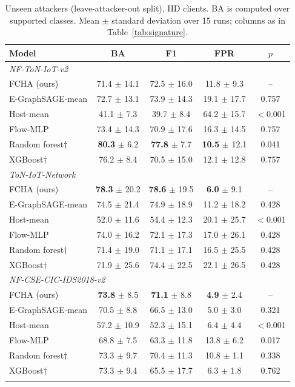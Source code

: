 \documentclass[pdflatex,sn-mathphys-num]{sn-jnl}
\newcommand{\best}[1]{\textbf{#1}}
\begin{document}
\begin{table}[t]
\caption{Unseen attackers (leave-attacker-out split), IID clients. BA is computed over supported classes. Mean $\pm$ standard deviation over 15 runs; columns as in Table~\ref{tab:signature}.}\label{tab:attacker}
\begin{tabular*}{\textwidth}{@{\extracolsep\fill}lcccc}
\toprule
Model & BA & F1 & FPR & $p$ \\
\midrule
\multicolumn{5}{l}{\emph{NF-ToN-IoT-v2}}\\
FCHA (ours) & 71.4 $\pm$ 14.1 & 72.5 $\pm$ 16.0 & 11.8 $\pm$ 9.3 & -- \\
E-GraphSAGE-mean & 72.7 $\pm$ 13.1 & 73.9 $\pm$ 14.3 & 19.1 $\pm$ 17.7 & 0.757 \\
Host-mean & 41.1 $\pm$ 7.3 & 39.7 $\pm$ 8.4 & 64.2 $\pm$ 15.7 & $<$0.001 \\
Flow-MLP & 73.4 $\pm$ 14.3 & 70.9 $\pm$ 17.6 & 16.3 $\pm$ 14.5 & 0.757 \\
Random forest$\dagger$ & \best{80.3} $\pm$ 6.2 & \best{77.8} $\pm$ 7.7 & \best{10.5} $\pm$ 12.1 & 0.041 \\
XGBoost$\dagger$ & 76.2 $\pm$ 8.4 & 70.5 $\pm$ 15.0 & 12.1 $\pm$ 12.8 & 0.757 \\
\midrule
\multicolumn{5}{l}{\emph{ToN-IoT-Network}}\\
FCHA (ours) & \best{78.3} $\pm$ 20.2 & \best{78.6} $\pm$ 19.5 & \best{6.0} $\pm$ 9.1 & -- \\
E-GraphSAGE-mean & 74.5 $\pm$ 21.4 & 74.9 $\pm$ 18.9 & 11.2 $\pm$ 18.2 & 0.428 \\
Host-mean & 52.0 $\pm$ 11.6 & 54.4 $\pm$ 12.3 & 20.1 $\pm$ 25.7 & $<$0.001 \\
Flow-MLP & 74.0 $\pm$ 16.2 & 72.1 $\pm$ 17.3 & 17.0 $\pm$ 26.1 & 0.428 \\
Random forest$\dagger$ & 71.4 $\pm$ 19.0 & 71.1 $\pm$ 17.1 & 16.5 $\pm$ 25.5 & 0.428 \\
XGBoost$\dagger$ & 71.9 $\pm$ 25.6 & 74.4 $\pm$ 22.5 & 22.1 $\pm$ 26.5 & 0.428 \\
\midrule
\multicolumn{5}{l}{\emph{NF-CSE-CIC-IDS2018-v2}}\\
FCHA (ours) & \best{73.8} $\pm$ 8.5 & \best{71.1} $\pm$ 8.8 & \best{4.9} $\pm$ 2.4 & -- \\
E-GraphSAGE-mean & 70.5 $\pm$ 8.8 & 66.5 $\pm$ 13.0 & 5.0 $\pm$ 3.0 & 0.321 \\
Host-mean & 57.2 $\pm$ 10.9 & 52.3 $\pm$ 15.1 & 6.4 $\pm$ 4.4 & $<$0.001 \\
Flow-MLP & 68.8 $\pm$ 7.5 & 63.3 $\pm$ 11.8 & 13.8 $\pm$ 6.2 & 0.017 \\
Random forest$\dagger$ & 73.3 $\pm$ 9.7 & 70.4 $\pm$ 11.3 & 10.8 $\pm$ 1.1 & 0.338 \\
XGBoost$\dagger$ & 73.3 $\pm$ 9.4 & 65.5 $\pm$ 17.7 & 6.3 $\pm$ 1.8 & 0.762 \\
\botrule
\end{tabular*}
\end{table}
\end{document}
